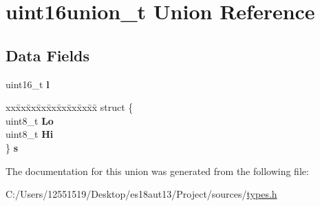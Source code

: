 \hypertarget{unionuint16union__t}{}\section{uint16union\+\_\+t Union Reference}
\label{unionuint16union__t}
\subsection*{Data Fields}
\begin{DoxyCompactItemize}
\item 
\hypertarget{unionuint16union__t_a99ee3a3f73300849c180c387230c7caa}{}uint16\+\_\+t {\bfseries l}\label{unionuint16union__t_a99ee3a3f73300849c180c387230c7caa}

\item 
\hypertarget{unionuint16union__t_ac6f9f8af6752db7d702f5f07f3de9523}{}\begin{tabbing}
xx\=xx\=xx\=xx\=xx\=xx\=xx\=xx\=xx\=\kill
struct \{\\
\>uint8\_t {\bfseries Lo}\\
\>uint8\_t {\bfseries Hi}\\
\} {\bfseries s}\label{unionuint16union__t_ac6f9f8af6752db7d702f5f07f3de9523}
\\

\end{tabbing}\end{DoxyCompactItemize}


The documentation for this union was generated from the following file\+:\begin{DoxyCompactItemize}
\item 
C\+:/\+Users/12551519/\+Desktop/es18aut13/\+Project/sources/\hyperlink{types_8h}{types.\+h}\end{DoxyCompactItemize}
